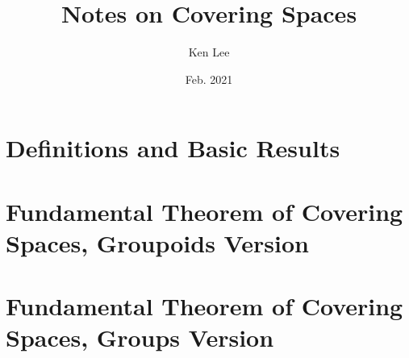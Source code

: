 \documentclass{article}
\begin{document}
\title{Notes on Covering Spaces}

\author{Ken Lee}
\date{Feb. 2021}
\maketitle

\tableofcontents

\section{Definitions and Basic Results}
\section{Fundamental Theorem of Covering Spaces, Groupoids Version}
  
\section{Fundamental Theorem of Covering Spaces, Groups Version}
  




\end{document}
